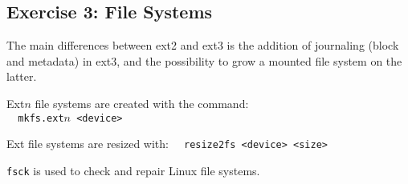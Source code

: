 \subsection{Exercise 3: File Systems}

The main differences between ext2 and ext3 is the addition of journaling (block and metadata) in ext3, and the possibility to grow a mounted file system on the latter.

Ext$n$ file systems are created with the command: \\
\verb=  mkfs.ext=$n$\verb= <device>=

Ext file systems are resized with:
\verb=  resize2fs <device> <size>=

\verb=fsck= is used to check and repair Linux file systems.

